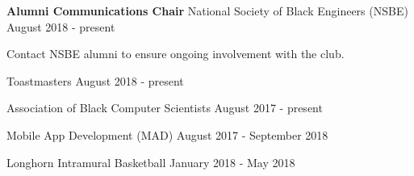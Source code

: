 

\begin{cventries}

  \cventry
    {\textbf{Alumni Communications Chair}} %
    {National Society of Black Engineers (NSBE)} %
    {August 2018 - present} %
    {
      \begin{cvitems} %
        \item {Contact NSBE alumni to ensure ongoing involvement with the club.}
      \end{cvitems}
    }

  \cventry
    {Toastmasters} %
    {August 2018 - present} %

  \cventry
    {Association of Black Computer Scientists} %
    {August 2017 - present} %

  \cventry
    {Mobile App Development (MAD)} %
    {August 2017 - September 2018} %

  \cventry
    {Longhorn Intramural Basketball} %
    {January 2018 - May 2018} %

\end{cventries}
